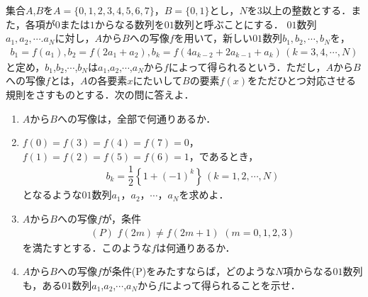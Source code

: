 \documentclass[../../main.tex]{subfiles}
\begin{document}
集合$A$,$B$を$A=\{0,1,2,3,4,5,6,7\}$，$B=\{0,1\}$とし，$N$を$3$以上の整数とする．また，各項が$0$または$1$からなる数列を$01$数列と呼ぶことにする．
$01$数列$a_1,a_2,\cdots.a_N$に対し，$A$から$B$への写像$f$を用いて，新しい$01$数列$b_1,b_2,\cdots,b_N$を，
\begin{align*}
  b_1=f(a_1),b_2=f(2a_1+a_2),b_k=f(4a_{k-2}+2a_{k-1}+a_k)\, (k=3,4,\cdots, N)
\end{align*}
と定め，$b_1$,$b_2$,$\cdots$,$b_N$は$a_1$,$a_2$,$\cdots$,$a_N$から$f$によって得られるという．ただし，$A$から$B$への写像$f$とは，$A$の各要素$x$にたいして$B$の要素$f(x)$をただひとつ対応させる規則をさすものとする．次の問に答えよ．
\begin{enumerate}
  \item $A$から$B$への写像は，全部で何通りあるか．
  \item $f(0)=f(3)=f(4)=f(7)=0$，$f(1)=f(2)=f(5)=f(6)=1$，であるとき，
    \begin{align*}
      b_k=\dfrac{1}{2}\left\{1+(-1)^k\right\}\, (k=1,2,\cdots,N)
    \end{align*}
    となるような$01$数列$a_1$，$a_2$，$\cdots$，$a_N$を求めよ．
  \item $A$から$B$への写像$f$が，条件
    \begin{align*}
      (P)\,\, f(2m)\neq f(2m+1)\,\, (m=0,1,2,3)
    \end{align*}
    を満たすとする．このような$f$は何通りあるか．
  \item $A$から$B$への写像$f$が条件(P)をみたすならば，どのような$N$項からなる$01$数列も，ある$01$数列$a_1$,$a_2$,$\cdots$,$a_N$から$f$によって得られることを示せ．
\end{enumerate}
\end{document}
